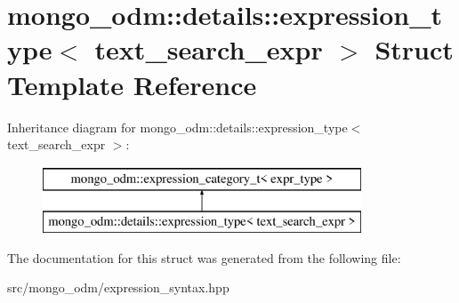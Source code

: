 \hypertarget{structmongo__odm_1_1details_1_1expression__type_3_01text__search__expr_01_4}{}\section{mongo\+\_\+odm\+:\+:details\+:\+:expression\+\_\+type$<$ text\+\_\+search\+\_\+expr $>$ Struct Template Reference}
\label{structmongo__odm_1_1details_1_1expression__type_3_01text__search__expr_01_4}
Inheritance diagram for mongo\+\_\+odm\+:\+:details\+:\+:expression\+\_\+type$<$ text\+\_\+search\+\_\+expr $>$\+:\begin{figure}[H]
\begin{center}
\leavevmode
\includegraphics[height=2.000000cm]{structmongo__odm_1_1details_1_1expression__type_3_01text__search__expr_01_4}
\end{center}
\end{figure}


The documentation for this struct was generated from the following file\+:\begin{DoxyCompactItemize}
\item 
src/mongo\+\_\+odm/expression\+\_\+syntax.\+hpp\end{DoxyCompactItemize}
